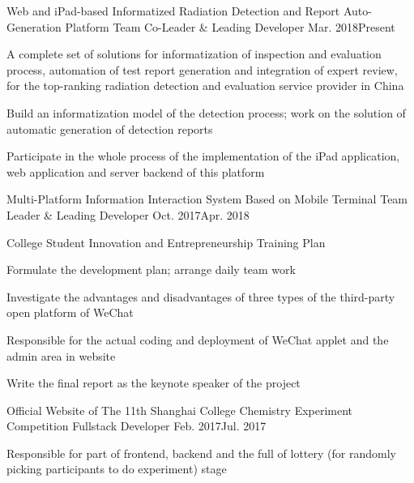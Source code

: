
\begin{projitem}
    {Web and iPad-based Informatized Radiation Detection and Report Auto-Generation Platform}
    {Team Co-Leader \& Leading Developer}
    {Mar. 2018}{Present}
    \item A complete set of solutions for informatization of inspection
          and evaluation process, automation of test report generation and
          integration of expert review, for the top-ranking radiation detection
          and evaluation service provider in China
    \item Build an informatization model of the detection process;
          work on the solution of automatic generation of detection reports
    \item Participate in the whole process of the implementation of the iPad application, web application and server backend of this platform
\end{projitem}

\begin{projitem}
    {Multi-Platform Information Interaction System Based on Mobile Terminal}
    {Team Leader \& Leading Developer}
    {Oct. 2017}{Apr. 2018}
    \item College Student Innovation and Entrepreneurship Training Plan
    \item Formulate the development plan; arrange daily team work
    \item Investigate the advantages and disadvantages of three types of the third-party open platform of WeChat
    \item Responsible for the actual coding and deployment of WeChat applet and the admin area in website
    \item Write the final report as the keynote speaker of the project
\end{projitem}

\begin{projitem}
    {Official Website of The 11th Shanghai College Chemistry Experiment Competition}
    {Fullstack Developer}
    {Feb. 2017}{Jul. 2017}
    \item Responsible for part of frontend, backend and the full of lottery (for randomly picking participants to do experiment) stage
\end{projitem}

\endinput
